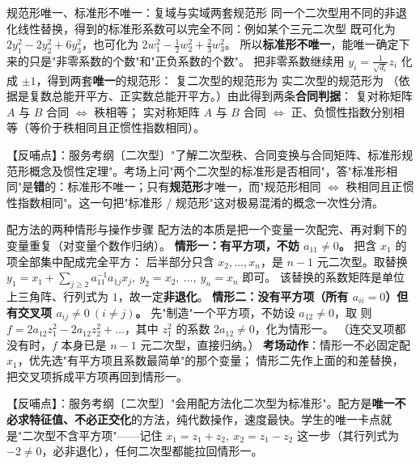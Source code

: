 \begin{fdeep}{规范形唯一、标准形不唯一：复域与实域两套规范形}
同一个二次型用不同的非退化线性替换，得到的标准形系数可以完全不同：例如某个三元二次型
既可化为 $2y_1^{2}-2y_2^{2}+6y_3^{2}$，也可化为 $2w_1^{2}-\frac{1}{2}w_2^{2}+\frac{2}{3}w_3^{2}$。
所以\textbf{标准形不唯一}，能唯一确定下来的只是"非零系数的个数"和"正负系数的个数"。
把非零系数继续用 $y_i=\frac{1}{\sqrt{d_i}}z_i$ 化成 $\pm1$，得到两套\textbf{唯一}的规范形：
复二次型的规范形为
实二次型的规范形为
（依据是复数总能开平方、正实数总能开平方。）由此得到两条\textbf{合同判据}：
复对称矩阵 $A$ 与 $B$ 合同 $\iff$ 秩相等；
实对称矩阵 $A$ 与 $B$ 合同 $\iff$ 正、负惯性指数分别相等（等价于秩相同且正惯性指数相同）。

【反哺点】：服务考纲〔二次型〕"了解二次型秩、合同变换与合同矩阵、标准形规范形概念及惯性定理"。考场上问"两个二次型的标准形是否相同"，答"标准形相同"是\textbf{错}的：标准形不唯一；只有\textbf{规范形}才唯一，而"规范形相同 $\iff$ 秩相同且正惯性指数相同"。这一句把"标准形 / 规范形"这对极易混淆的概念一次性分清。
\end{fdeep}

\begin{fdeep}{配方法的两种情形与操作步骤}
配方法的本质是把一个变量一次配完、再对剩下的变量重复（对变量个数作归纳）。
\textbf{情形一：有平方项，不妨 $a_{11}\ne0$。} 把含 $x_1$ 的项全部集中配成完全平方：
后半部分只含 $x_2,\dots,x_n$，是 $n-1$ 元二次型。取替换
$y_1=x_1+\sum_{j\ge2}a_{11}^{-1}a_{1j}x_j,\ y_2=x_2,\ \dots,\ y_n=x_n$ 即可。
该替换的系数矩阵是单位上三角阵、行列式为 $1$，故一定\textbf{非退化}。
\textbf{情形二：没有平方项（所有 $a_{ii}=0$）但有交叉项 $a_{ij}\ne0\ (i\ne j)$。}
先"制造"一个平方项，不妨设 $a_{12}\ne0$，取
则 $f=2a_{12}z_1^{2}-2a_{12}z_2^{2}+\dots$，其中 $z_1^{2}$ 的系数 $2a_{12}\ne0$，化为情形一。
（连交叉项都没有时，$f$ 本身已是 $n-1$ 元二次型，直接归纳。）
\textbf{考场动作}：情形一不必固定配 $x_1$，优先选"有平方项且系数最简单"的那个变量；
情形二先作上面的和差替换，把交叉项拆成平方项再回到情形一。

【反哺点】：服务考纲〔二次型〕"会用配方法化二次型为标准形"。配方是\textbf{唯一不必求特征值、不必正交化}的方法，纯代数操作，速度最快。学生的唯一卡点就是"二次型不含平方项"——记住 $x_1=z_1+z_2,\ x_2=z_1-z_2$ 这一步（其行列式为 $-2\ne0$，必非退化），任何二次型都能拉回情形一。
\end{fdeep}

